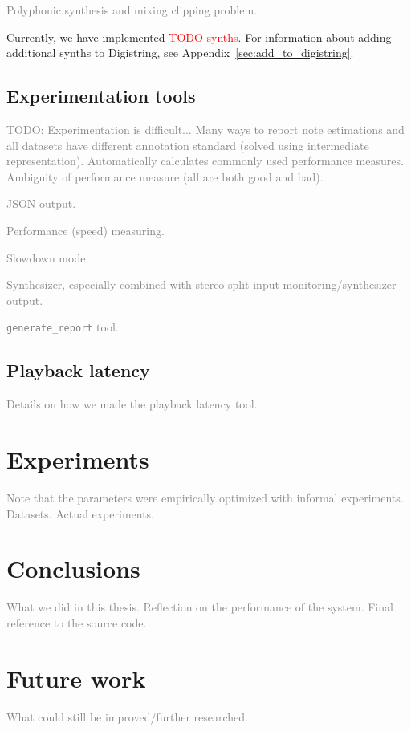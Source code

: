 \documentclass[10pt,twocolumn]{article}
\begin{document}
\textcolor{gray}{Polyphonic synthesis and mixing clipping problem.}

Currently, we have implemented \textcolor{red}{TODO synths}. For information about adding additional synths to Digistring, see Appendix~\ref{sec:add_to_digistring}.


\subsection{Experimentation tools}
\textcolor{gray}{TODO: Experimentation is difficult... Many ways to report note estimations and all datasets have different annotation standard (solved using intermediate representation). Automatically calculates commonly used performance measures. Ambiguity of performance measure (all are both good and bad).}

\textcolor{gray}{JSON output.}

\textcolor{gray}{Performance (speed) measuring.}

\textcolor{gray}{Slowdown mode.}

\textcolor{gray}{Synthesizer, especially combined with stereo split input monitoring/synthesizer output.}

\textcolor{gray}{\texttt{generate\_report} tool.}


\subsection{Playback latency}  \label{sub:playback_latency}
\textcolor{gray}{Details on how we made the playback latency tool.}



\section{Experiments}  \label{sec:exp}
\textcolor{gray}{Note that the parameters were empirically optimized with informal experiments. Datasets. Actual experiments.}



\section{Conclusions}
\textcolor{gray}{What we did in this thesis. Reflection on the performance of the system. Final reference to the source code.}



\section{Future work}  \label{sec:future}
\textcolor{gray}{What could still be improved/further researched.}
\end{document}
